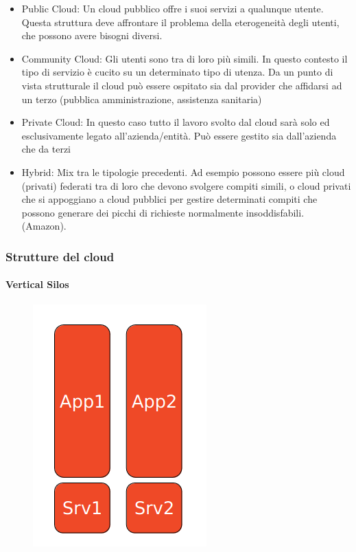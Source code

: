 \documentclass{article}
\begin{document}
		\begin{itemize}
		    \item Public Cloud: Un cloud pubblico offre i suoi servizi a qualunque utente. Questa struttura deve affrontare il problema della eterogeneità degli utenti, che possono avere bisogni diversi.
		    \item Community Cloud: Gli utenti sono tra di loro più simili. In questo contesto il tipo di servizio è cucito su un determinato tipo di utenza. Da un punto di vista strutturale il cloud può essere ospitato sia dal provider che affidarsi ad un terzo (pubblica amministrazione, assistenza sanitaria)
		    \item Private Cloud:
		    In questo caso tutto il lavoro svolto dal cloud sarà solo ed esclusivamente legato all'azienda/entità.
		    Può essere gestito sia dall'azienda che da terzi
		    \item Hybrid: Mix tra le tipologie precedenti. Ad esempio possono essere più cloud (privati) federati tra di loro che devono svolgere compiti simili, o cloud privati che si appoggiano a cloud pubblici per gestire determinati compiti che possono generare dei picchi di richieste normalmente insoddisfabili. (Amazon).
		\end{itemize}
		
		\subsubsection{Strutture del cloud}
		\paragraph{Vertical Silos}
		\begin{figure}
			\centering
			\includegraphics[width=0.4\linewidth]{SAC_A2_verticalsilos}
			\label{fig:saca2verticalsilos}
		\end{figure}
		
\end{document}
